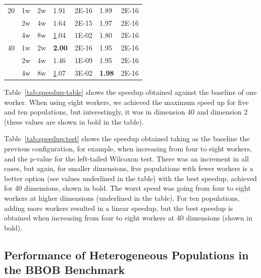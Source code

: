 \documentclass[review]{elsarticle}
\begin{document}
\begin{table}[h!tbp]
\begin{tabular}{lllllll}
  20        & 1w            & 2w            & 1.91            & 2E-16           & 1.89             & 2E-16           \\
            & 2w            & 4w            & 1.64            & 2E-15           & 1.97             & 2E-16           \\
            & 4w            & 8w            & {\ul 1.04 }     & 1E-02           & 1.80             & 2E-16           \\
  40        & 1w            & 2w            & \textbf{2.00}   & 2E-16           & 1.95             & 2E-16           \\
            & 2w            & 4w            & 1.46            & 1E-09           & 1.95             & 2E-16           \\
            & 4w            & 8w            & {\ul 1.07}            & 3E-02           & \textbf{1.98}    & 2E-16          
  \end{tabular}
  \end{table}
%
Table~\ref{tab:speedup-table} shows the speedup obtained against the baseline of
one worker. When using eight workers, we achieved the maximum speed up for five
and ten populations, but interestingly, it was in dimension 40 and dimension 2 
(these values are shown in bold in the table). 

Table~\ref{tab:speedup:test} shows the speedup obtained taking as the baseline
the previous configuration, for example, when increasing from four to eight
workers, and the p-value for the left-tailed Wilcoxon test. There was an
increment in all cases, but again, for smaller dimensions, five populations with
fewer workers is a better option (see values underlined in the table) with the
best speedup, achieved for 40 dimensions, shown in bold. The worst speed was
going from four to eight workers at higher dimensions (underlined in the table).
For ten populations, adding more workers resulted in a linear speedup, but the
best speedup is obtained when increasing from four to eight workers at 40
dimensions (shown in bold).


\subsection{Performance of Heterogeneous Populations in the BBOB Benchmark}
\label{sec:exp2}

\end{document}
